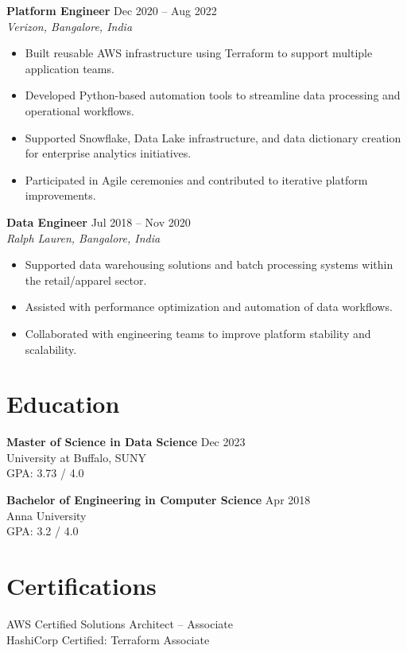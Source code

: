 \documentclass[10pt]{article}
\begin{document}
\textbf{Platform Engineer} \hfill Dec 2020 -- Aug 2022 \\
\textit{Verizon, Bangalore, India}
\begin{itemize}[leftmargin=*, itemsep=3pt]
    \item Built reusable AWS infrastructure using Terraform to support multiple application teams.
    \item Developed Python-based automation tools to streamline data processing and operational workflows.
    \item Supported Snowflake, Data Lake infrastructure, and data dictionary creation for enterprise analytics initiatives.
    \item Participated in Agile ceremonies and contributed to iterative platform improvements.
\end{itemize}

\textbf{Data Engineer} \hfill Jul 2018 -- Nov 2020 \\
\textit{Ralph Lauren, Bangalore, India}
\begin{itemize}[leftmargin=*, itemsep=3pt]
    \item Supported data warehousing solutions and batch processing systems within the retail/apparel sector.
    \item Assisted with performance optimization and automation of data workflows.
    \item Collaborated with engineering teams to improve platform stability and scalability.
\end{itemize}

\section*{Education}

\textbf{Master of Science in Data Science} \hfill Dec 2023 \\
University at Buffalo, SUNY \\
GPA: 3.73 / 4.0

\textbf{Bachelor of Engineering in Computer Science} \hfill Apr 2018 \\
Anna University \\
GPA: 3.2 / 4.0

\section*{Certifications}
AWS Certified Solutions Architect – Associate \\
HashiCorp Certified: Terraform Associate
\end{document}
